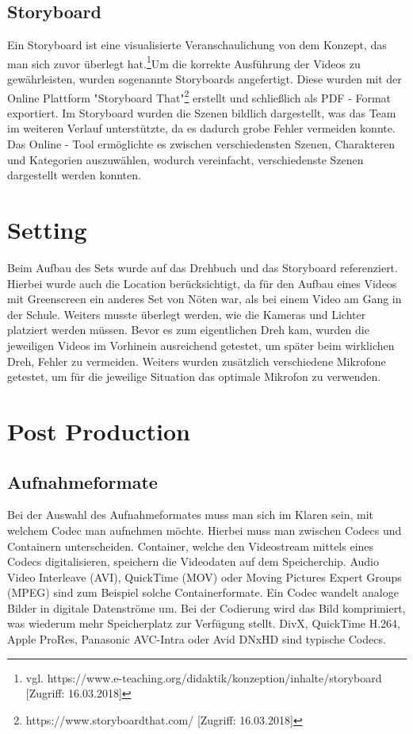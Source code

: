 \subsection{Storyboard}
Ein Storyboard ist eine visualisierte Veranschaulichung von dem Konzept, das man sich zuvor überlegt hat.\footnote{\label{}vgl. https://www.e-teaching.org/didaktik/konzeption/inhalte/storyboard [Zugriff: 16.03.2018]}Um die korrekte Ausführung der Videos zu gewährleisten, wurden sogenannte Storyboards angefertigt. Diese wurden mit der Online Plattform "Storyboard That"\footnote{\label{}https://www.storyboardthat.com/ [Zugriff: 16.03.2018]} erstellt und schließlich als PDF - Format exportiert.
Im Storyboard wurden die Szenen bildlich dargestellt, was das Team im weiteren Verlauf unterstützte, da es dadurch grobe Fehler vermeiden konnte.
Das Online - Tool ermöglichte es zwischen verschiedensten Szenen, Charakteren und Kategorien auszuwählen, wodurch vereinfacht, verschiedenste Szenen dargestellt werden konnten. 
\section{Setting}
Beim Aufbau des Sets wurde auf das Drehbuch und das Storyboard referenziert. Hierbei wurde auch die Location berücksichtigt, da für den Aufbau eines Videos mit Greenscreen ein anderes Set von Nöten war, als bei einem Video am Gang in der Schule. Weiters musste überlegt werden, wie die Kameras und Lichter platziert werden müssen. Bevor es zum eigentlichen Dreh kam, wurden die jeweiligen Videos im Vorhinein ausreichend getestet, um später beim wirklichen Dreh, Fehler zu vermeiden. Weiters wurden zusätzlich verschiedene Mikrofone getestet, um für die jeweilige Situation das optimale Mikrofon zu verwenden.
\section{Post Production}
\subsection{Aufnahmeformate}
Bei der Auswahl des Aufnahmeformates muss man sich im Klaren sein, mit welchem Codec man aufnehmen möchte. Hierbei muss man zwischen Codecs und Containern unterscheiden. Container, welche den Videostream mittels eines Codecs digitalisieren, speichern die Videodaten auf dem Speicherchip. Audio Video Interleave (AVI), QuickTime (MOV) oder Moving Pictures Expert Groups (MPEG) sind zum Beispiel solche Containerformate. Ein Codec wandelt analoge Bilder in digitale Datenströme um. Bei der Codierung wird das Bild komprimiert, was wiederum mehr Speicherplatz zur Verfügung stellt. DivX, QuickTime H.264, Apple ProRes, Panasonic AVC-Intra oder Avid DNxHD sind typische Codecs. 
